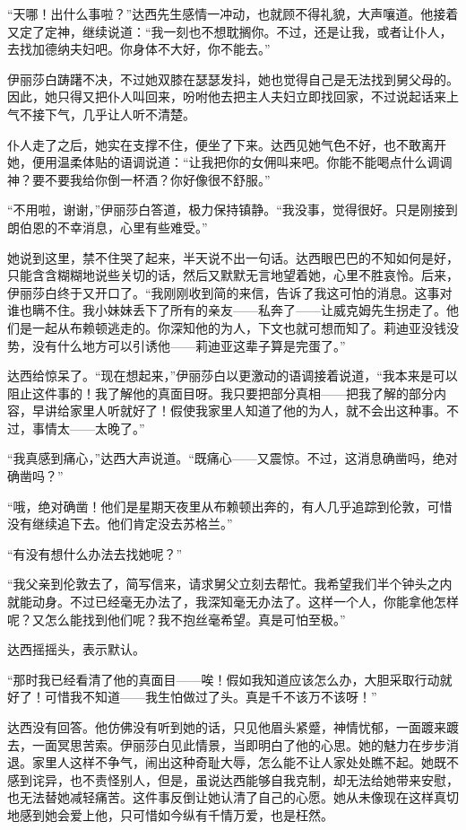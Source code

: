 \par “天哪！出什么事啦？”达西先生感情一冲动，也就顾不得礼貌，大声嚷道。他接着又定了定神，继续说道：“我一刻也不想耽搁你。不过，还是让我，或者让仆人，去找加德纳夫妇吧。你身体不大好，你不能去。”
\par 伊丽莎白踌躇不决，不过她双膝在瑟瑟发抖，她也觉得自己是无法找到舅父母的。因此，她只得又把仆人叫回来，吩咐他去把主人夫妇立即找回家，不过说起话来上气不接下气，几乎让人听不清楚。
\par 仆人走了之后，她实在支撑不住，便坐了下来。达西见她气色不好，也不敢离开她，便用温柔体贴的语调说道：“让我把你的女佣叫来吧。你能不能喝点什么调调神？要不要我给你倒一杯酒？你好像很不舒服。”
\par “不用啦，谢谢，”伊丽莎白答道，极力保持镇静。“我没事，觉得很好。只是刚接到朗伯恩的不幸消息，心里有些难受。”
\par 她说到这里，禁不住哭了起来，半天说不出一句话。达西眼巴巴的不知如何是好，只能含含糊糊地说些关切的话，然后又默默无言地望着她，心里不胜哀怜。后来，伊丽莎白终于又开口了。“我刚刚收到简的来信，告诉了我这可怕的消息。这事对谁也瞒不住。我小妹妹丢下了所有的亲友——私奔了——让威克姆先生拐走了。他们是一起从布赖顿逃走的。你深知他的为人，下文也就可想而知了。莉迪亚没钱没势，没有什么地方可以引诱他——莉迪亚这辈子算是完蛋了。”
\par 达西给惊呆了。“现在想起来，”伊丽莎白以更激动的语调接着说道，“我本来是可以阻止这件事的！我了解他的真面目呀。我只要把部分真相——把我了解的部分内容，早讲给家里人听就好了！假使我家里人知道了他的为人，就不会出这种事。不过，事情太——太晚了。”
\par “我真感到痛心，”达西大声说道。“既痛心——又震惊。不过，这消息确凿吗，绝对确凿吗？”
\par “哦，绝对确凿！他们是星期天夜里从布赖顿出奔的，有人几乎追踪到伦敦，可惜没有继续追下去。他们肯定没去苏格兰。”
\par “有没有想什么办法去找她呢？”
\par “我父亲到伦敦去了，简写信来，请求舅父立刻去帮忙。我希望我们半个钟头之内就能动身。不过已经毫无办法了，我深知毫无办法了。这样一个人，你能拿他怎样呢？又怎么能找到他们呢？我不抱丝毫希望。真是可怕至极。”
\par 达西摇摇头，表示默认。
\par “那时我已经看清了他的真面目——唉！假如我知道应该怎么办，大胆采取行动就好了！可惜我不知道——我生怕做过了头。真是千不该万不该呀！”
\par 达西没有回答。他仿佛没有听到她的话，只见他眉头紧蹙，神情忧郁，一面踱来踱去，一面冥思苦索。伊丽莎白见此情景，当即明白了他的心思。她的魅力在步步消退。家里人这样不争气，闹出这种奇耻大辱，怎么能不让人家处处瞧不起。她既不感到诧异，也不责怪别人，但是，虽说达西能够自我克制，却无法给她带来安慰，也无法替她减轻痛苦。这件事反倒让她认清了自己的心愿。她从未像现在这样真切地感到她会爱上他，只可惜如今纵有千情万爱，也是枉然。
